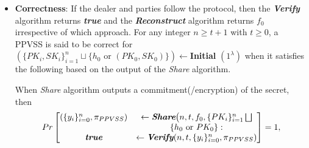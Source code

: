 \begin{itemize}
  \item \textbf{Correctness}: If the dealer and parties follow the protocol, then the \textit{\textbf{Verify}} 
    algorithm returns \textit{\textbf{true}} and the \textit{\textbf{Reconstruct}} algorithm returns $f_0$ 
    irrespective of which approach. For any integer $n\geq t+1$ with $t\geq0$, a PPVSS is said 
    to be correct for
    $\left(\{PK_i,SK_i\}_{i=1}^n\sqcup\{h_0\text{ or }(PK_0,SK_0)\}\right)\leftarrow$\textbf{Initial} $(1^\lambda)$ when 
    it satisfies the following based on the output of the \textit{Share} algorithm.\par
   When \textit{Share} algorithm outputs a commitment(/encryption) of the secret, then
        \begin{align*}
          Pr\begin{bmatrix}
            (\{y_i\}_{i=0}^n,\pi_{PPVSS})&\leftarrow \textit{\textbf{Share}} \big(n,t,f_0,\{PK_i\}_{i=1}^n\bigsqcup\\
            &\{h_0\text{ or }PK_0\}:\\
            \textit{\textbf{true}}&\leftarrow \textit{\textbf{Verify}} (n,t,\{y_i\}_{i=0}^n,\pi_{PPVSS})
          \end{bmatrix} = 1,
        \end{align*}
    

\end{itemize}
